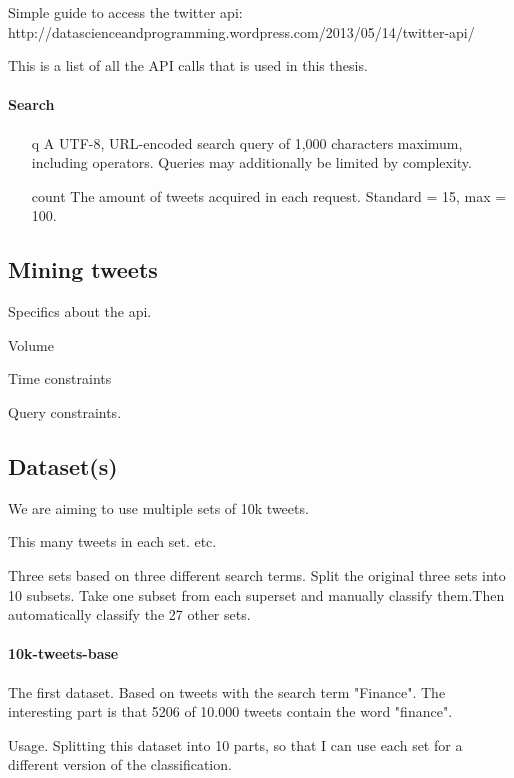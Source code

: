 Simple guide to access the twitter api:  http://datascienceandprogramming.wordpress.com/2013/05/14/twitter-api/

This is a list of all the API calls that is used in this thesis.
\paragraph{Search} 
\begin{itemize}
\item[q] A UTF-8, URL-encoded search query of 1,000 characters maximum, including
operators. Queries may additionally be limited by complexity.

\item[count] The amount of tweets acquired in each request. Standard = 15, max
= 100. 

\end{itemize}

\subsection{Mining tweets} %

Specifics about the api. 

Volume

Time constraints 

Query constraints. 

\subsection{Dataset(s)}
We are aiming to use multiple sets of 10k tweets. 

This many tweets in each set. etc. 

Three sets based on three different search terms.
Split the original three sets into 10 subsets. 
Take one subset from each superset and manually classify them.Then
automatically classify the 27 other sets.  

\paragraph{10k-tweets-base}
The first dataset.
Based on tweets with the search term "Finance". 
The interesting part is that 5206 of 10.000 tweets contain the word "finance".

Usage. Splitting this dataset into 10 parts, so that I can use each set for a
different version of the classification. 

